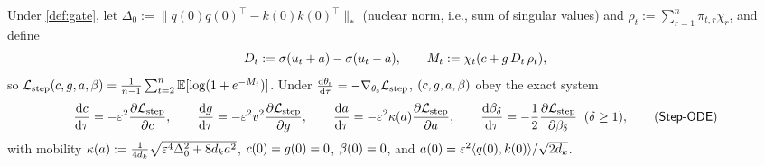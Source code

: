 \begin{proposition}
\label{prop:reduced-transition}
Under \cref{def:gate}, let $\Delta_0 := \|q(0)q(0)^\top - k(0)k(0)^\top\|_*$ (nuclear norm, i.e., sum of singular values) and $\rho_t := \sum_{r=1}^n \pi_{t,r}\chi_r$, and define
\[
  D_t := \sigma(u_t + a) - \sigma(u_t - a), \qquad
  M_t := \chi_t(c + g\,D_t\,\rho_t),
\]
so $\mathcal L_{\mathrm{step}}(c,g,a,\beta) = \frac{1}{n-1}\sum_{t=2}^n \mathbb E[\log(1 + e^{-M_t})]$. Under $\ddtau{\theta_{\mathrm s}} = -\nabla_{\theta_{\mathrm s}}\Lstep$, $(c, g, a, \beta)$ obey the exact system
\begin{equation*}
  \ddtau{\cnt} = -\initscale^2\pd{\Lstep}{\cnt}, \qquad
  \ddtau{g} = -\initscale^2 v^2\pd{\Lstep}{g}, \qquad
  \ddtau{a} = -\initscale^2\kappa(a)\pd{\Lstep}{a}, \qquad
  \ddtau{\brel_\delta} = -\frac{1}{2}\pd{\Lstep}{\brel_\delta} \;\; (\delta \ge 1),
  \tag{\textsf{Step-ODE}}
  \label{eq:reduced-transition}
\end{equation*}
with mobility $\kappa(a) := \frac{1}{4d_k}\sqrt{\varepsilon^4\Delta_0^2 + 8d_k a^2}$, $c(0) = g(0) = 0$, $\beta(0) = 0$, and $a(0) = \varepsilon^2\langle q(0), k(0)\rangle/\sqrt{2d_k}$.
\end{proposition}

